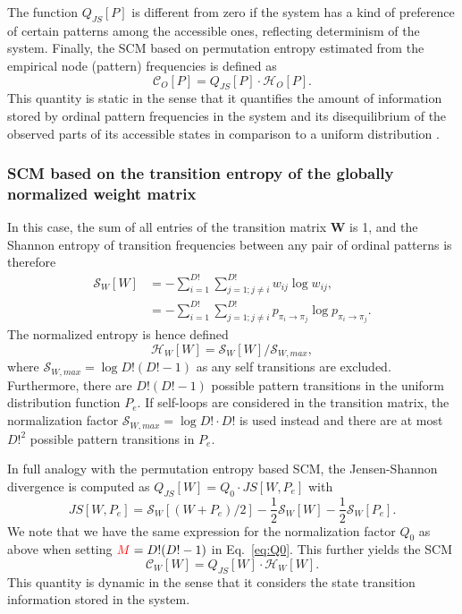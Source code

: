 \documentclass[aip,cha,reprint,nofootinbib]{revtex4-1}
\begin{document}
The function $Q_{JS}[P]$ is different from zero if the system has a kind of preference of certain patterns among the accessible ones, reflecting determinism of the system. Finally, the SCM based on permutation entropy estimated from the empirical node (pattern) frequencies is defined as 
\begin{equation}
\mathcal{C}_{O}[P] = Q_{JS}[P] \cdot \mathcal{H}_{O}[P].
\end{equation}
This quantity is static in the sense that it quantifies the amount of information stored by ordinal pattern frequencies in the system and its disequilibrium of the observed parts of its accessible states in comparison to a uniform distribution \cite{LopezPLA1995}. 

\subsubsection{SCM based on the transition entropy of the globally normalized weight matrix} 

In this case, the sum of all entries of the transition matrix $\mathbf{W}$ is 1, and the Shannon entropy of transition frequencies between any pair of ordinal patterns is therefore 
\begin{equation}
\begin{split}
\mathcal{S}_{W}[W] &= - \sum_{i=1}^{D!} \sum_{j = 1; j \neq i}^{D!} w_{ij} \log w_{ij}, \\
& = - \sum_{i=1}^{D!} \sum_{j =1; j \neq i}^{D!} p_{\pi_i \to \pi_j} \log p_{\pi_i \to \pi_j}. 
\end{split}
\end{equation}
The normalized entropy is hence defined 
\begin{equation}
\mathcal{H}_{W}[W] = \mathcal{S}_{W}[W] / \mathcal{S}_{W, max}, 
\end{equation}
where $\mathcal{S}_{W, max} = \log D! (D! - 1)$ as any self transitions are excluded. Furthermore, there are $D! (D! - 1)$ possible pattern transitions in the uniform distribution function $P_e$. {\color{red}If self-loops are considered in the transition matrix, the normalization factor $\mathcal{S}_{W, max} = \log D! \cdot D!$ is used instead and there are at most $D!^2$ possible pattern transitions in $P_e$. } 

In full analogy with the permutation entropy based SCM, the Jensen-Shannon divergence is computed as $Q_{JS}[W] = Q_0 \cdot JS[W, P_e]$ with
\begin{equation}
JS [W, P_e] = \mathcal{S}_{W}[(W + P_e)/2] - \frac{1}{2}\mathcal{S}_{W}[W] - \frac{1}{2}\mathcal{S}_{W}[P_e]. 
\end{equation}
We note that we have the same expression for the normalization factor $Q_0$ as above when setting ${\color{red}M} = D! (D! - 1)$ in Eq.~\eqref{eq:Q0}. This further yields the SCM 
\begin{equation}
\mathcal{C}_{W}[W] = Q_{JS}[W] \cdot \mathcal{H}_{W}[W].
\end{equation}
This quantity is dynamic in the sense that it considers the state transition information stored in the system. 
\end{document}
